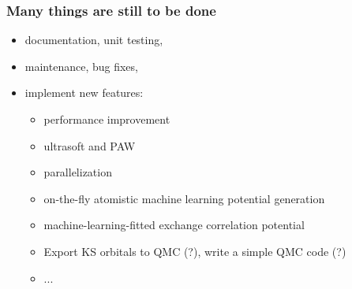 \begin{frame}
\frametitle{Many things are still to be done}

\begin{itemize}
\item documentation, unit testing, 
\item maintenance, bug fixes, 
\item implement new features:
  \begin{itemize}
  \item performance improvement
  \item ultrasoft and PAW
  \item parallelization
  \item on-the-fly atomistic machine learning potential generation
  \item machine-learning-fitted exchange correlation potential
  \item Export KS orbitals to QMC (?), write a simple QMC code (?)
  \item ...
  \end{itemize}
\end{itemize}

\end{frame}




